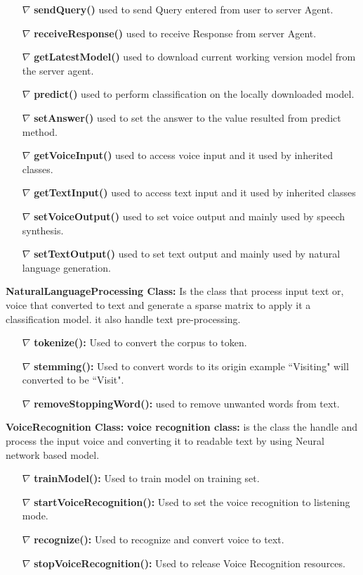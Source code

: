 \documentclass{scrreprt}
\begin{document}
\begin{itemize}

\item[$\nabla$] \textbf{sendQuery()} used to send Query entered from user to server Agent.
\item[$\nabla$] \textbf{receiveResponse()} used to receive Response from server Agent.
\item[$\nabla$] \textbf{getLatestModel()} used to download current working version model from the server agent.
\item[$\nabla$] \textbf{predict()} used to perform classification on the locally downloaded model.
\item[$\nabla$] \textbf{setAnswer()} used to set the answer to the value resulted from predict method.
\item[$\nabla$] \textbf{getVoiceInput()} used to access voice input and it used by inherited classes.
\item[$\nabla$] \textbf{getTextInput()} used to access text input and it used by inherited classes
\item[$\nabla$] \textbf{setVoiceOutput()} used to set voice output and mainly used by speech synthesis.
\item[$\nabla$] \textbf{setTextOutput()} used to set text output and mainly used by natural language generation.
\end{itemize}

\textbf{NaturalLanguageProcessing Class:} Is the class that process input text or, voice that converted to text and generate a sparse matrix to apply it a classification model. it also handle text pre-processing.
\begin{itemize}

	\item[$\nabla$] \textbf{tokenize():} Used to convert the corpus to token.
	\item[$\nabla$] \textbf{stemming():} Used to convert words to its origin example ``Visiting" will converted to be ``Visit".
	\item[$\nabla$] \textbf{removeStoppingWord():} used to remove unwanted words from text.
\end{itemize}

\textbf{VoiceRecognition Class:} \textbf{voice recognition class:} is the class the handle and process the input voice and converting it to readable text by using Neural network based model.
\begin{itemize}

	\item[$\nabla$] \textbf{trainModel():} Used to train model on training set.
	\item[$\nabla$] \textbf{startVoiceRecognition():} Used to set the voice recognition to listening mode.
	\item[$\nabla$] \textbf{recognize():} Used to recognize and convert voice to text.
	\item[$\nabla$] \textbf{stopVoiceRecognition():} Used to release Voice Recognition resources.
\end{itemize}
\end{document}
